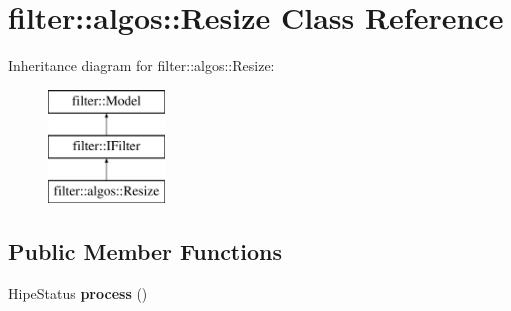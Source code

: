 \hypertarget{classfilter_1_1algos_1_1_resize}{}\section{filter\+:\+:algos\+:\+:Resize Class Reference}
\label{classfilter_1_1algos_1_1_resize}
Inheritance diagram for filter\+:\+:algos\+:\+:Resize\+:\begin{figure}[H]
\begin{center}
\leavevmode
\includegraphics[height=3.000000cm]{de/d18/classfilter_1_1algos_1_1_resize}
\end{center}
\end{figure}
\subsection*{Public Member Functions}
\begin{DoxyCompactItemize}
\item 
\mbox{\label{classfilter_1_1algos_1_1_resize_abef1ffa950b459845558fea1499c0a10}} 
Hipe\+Status {\bfseries process} ()
\end{DoxyCompactItemize}
